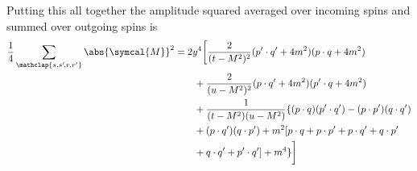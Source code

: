 \documentclass[fleqn]{NotesClass}
\newcommand{\amplitude}{\symcal{M}}
\begin{document}
    Putting this all together the amplitude squared averaged over incoming spins and summed over outgoing spins is
    \begin{align}
        \frac{1}{4} \sum_{\mathclap{s, s'\!, r, r'}} \abs{\amplitude}^2 &= 2y^4\bigg[ \frac{2}{(t - M^2)^2} (p' \cdot q' + 4m^2)(p \cdot q + 4m^2)\\
        &\qquad + \frac{2}{(u - M^2)^2} (p \cdot q' + 4m^2)(p' \cdot q + 4m^2) \notag\\
        &\qquad + \frac{1}{(t - M^2)(u - M^2)}\{(p \cdot q)(p' \cdot q') - (p \cdot p')(q \cdot q') \notag\\
        &\qquad + (p \cdot q')(q \cdot p') + m^2[p \cdot q + p \cdot p' + p \cdot q' + q \cdot p'\notag\\
        &\qquad + q \cdot q' + p' \cdot q'] + m^4\} \bigg]\notag\\
    \end{align}
    
\end{document}
